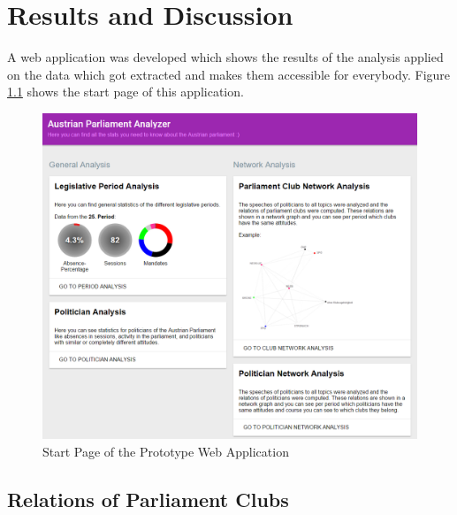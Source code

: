 \chapter{Results and Discussion}
\label{chap:evaluation}

A web application was developed which shows the results of the analysis applied on the data which got extracted and makes them accessible for everybody. Figure \ref{fig:start_page_prototype} shows the start page of this application.

\begin{figure}[h]
	\includegraphics[width=\textwidth]{imgs/result_start_page}
	\caption{Start Page of the Prototype Web Application}
	\label{fig:start_page_prototype}
\end{figure}

\section{Relations of Parliament Clubs}
\label{sec:relations_clubs}

